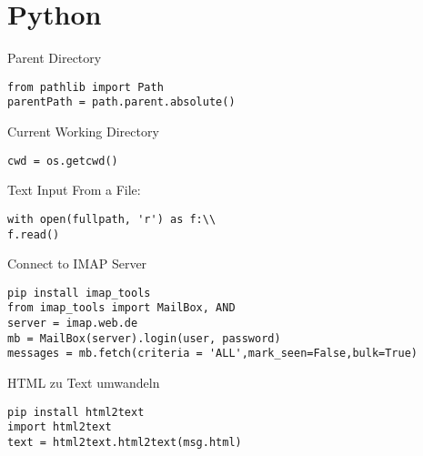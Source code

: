 \chapter{Python}\label{chap:Python}
Parent Directory
\begin{verbatim}
from pathlib import Path
parentPath = path.parent.absolute()
\end{verbatim}
Current Working Directory
\begin{Verbatim}[frame=single,baselinestretch=0.1]
cwd = os.getcwd()
\end{Verbatim}
Text Input From a File:
\begin{Verbatim}[frame=single,baselinestretch=0.1]
with open(fullpath, 'r') as f:\\
f.read()
\end{Verbatim}
Connect to IMAP Server
\begin{verbatim}
pip install imap_tools
from imap_tools import MailBox, AND
server = imap.web.de
mb = MailBox(server).login(user, password)
messages = mb.fetch(criteria = 'ALL',mark_seen=False,bulk=True)
\end{verbatim}
HTML zu Text umwandeln
\begin{verbatim}
pip install html2text
import html2text
text = html2text.html2text(msg.html)
\end{verbatim}